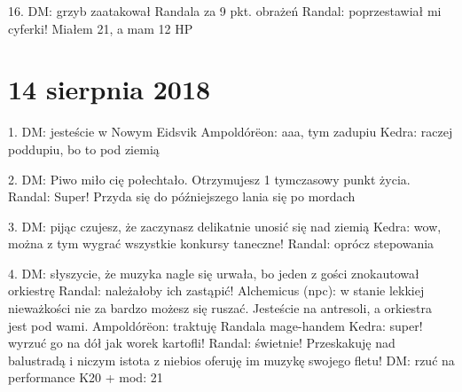\documentclass[10pt,twoside,twocolumn]{book}
\begin{document}
16. DM: grzyb zaatakował Randala za 9 pkt. obrażeń
Randal: poprzestawiał mi cyferki! Miałem 21, a mam 12 HP

\section*{14 sierpnia 2018}

1. DM: jesteście w Nowym Eidsvik
Ampoldórëon: aaa, tym zadupiu
Kedra: raczej poddupiu, bo to pod ziemią

2. DM: Piwo miło cię połechtało. Otrzymujesz 1 tymczasowy punkt życia.
Randal: Super! Przyda się do późniejszego lania się po mordach

3. DM: pijąc czujesz, że zaczynasz delikatnie unosić się nad ziemią
Kedra: wow, można z tym wygrać wszystkie konkursy taneczne!
Randal: oprócz stepowania

4. DM: słyszycie, że muzyka nagle się urwała, bo jeden z gości znokautował orkiestrę
Randal: należałoby ich zastąpić!
Alchemicus (npc): w stanie lekkiej nieważkości nie za bardzo możesz się ruszać. Jesteście na antresoli, a orkiestra jest pod wami.
Ampoldórëon: traktuję Randala mage-handem
Kedra: super! wyrzuć go na dół jak worek kartofli!
Randal: świetnie! Przeskakuję nad balustradą i niczym istota z niebios oferuję im muzykę swojego fletu!
DM: rzuć na performance
K20 + mod: 21
\end{document}
